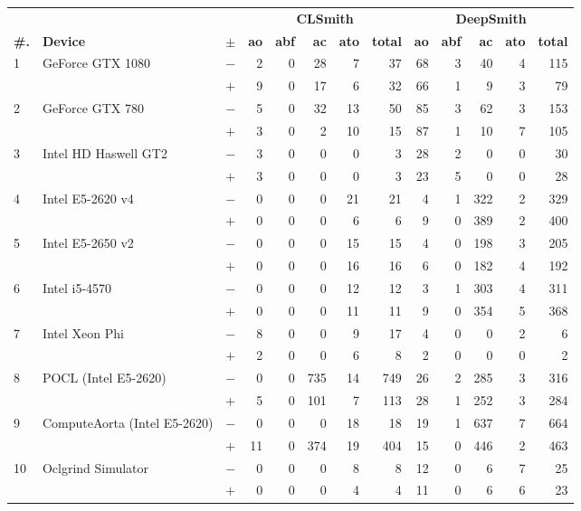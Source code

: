   \begin{tabular}{lll | rrrrr | rrrrr }
  \toprule
  & & & \multicolumn{5}{c|}{\textbf{CLSmith}} & \multicolumn{5}{c}{\textbf{DeepSmith}} \\
  \textbf{\#.} & \textbf{Device} & $\pm$ &
  \textbf{ao} & \textbf{abf} & \textbf{ac} & \textbf{ato} & \textbf{total} &
  \textbf{ao} & \textbf{abf} & \textbf{ac} & \textbf{ato} & \textbf{total} \\
  \midrule
  \multirow{ 2}{*}{1} & \multirow{ 2}{*}{GeForce GTX 1080} & $-$ & 2 & 0 & 28 & 7 & 37       & 68 & 3 & 40 & 4 & 115 \\& & $+$ & 9 & 0 & 17 & 6 & 32 & 66 & 1 & 9 & 3 & 79 \\
\hline
\multirow{ 2}{*}{2} & \multirow{ 2}{*}{GeForce GTX 780} & $-$ & 5 & 0 & 32 & 13 & 50       & 85 & 3 & 62 & 3 & 153 \\& & $+$ & 3 & 0 & 2 & 10 & 15 & 87 & 1 & 10 & 7 & 105 \\
\hline
\multirow{ 2}{*}{3} & \multirow{ 2}{*}{Intel HD Haswell GT2} & $-$ & 3 & 0 & 0 & 0 & 3       & 28 & 2 & 0 & 0 & 30 \\& & $+$ & 3 & 0 & 0 & 0 & 3 & 23 & 5 & 0 & 0 & 28 \\
\hline
\multirow{ 2}{*}{4} & \multirow{ 2}{*}{Intel E5-2620 v4} & $-$ & 0 & 0 & 0 & 21 & 21       & 4 & 1 & 322 & 2 & 329 \\& & $+$ & 0 & 0 & 0 & 6 & 6 & 9 & 0 & 389 & 2 & 400 \\
\hline
\multirow{ 2}{*}{5} & \multirow{ 2}{*}{Intel E5-2650 v2} & $-$ & 0 & 0 & 0 & 15 & 15       & 4 & 0 & 198 & 3 & 205 \\& & $+$ & 0 & 0 & 0 & 16 & 16 & 6 & 0 & 182 & 4 & 192 \\
\hline
\multirow{ 2}{*}{6} & \multirow{ 2}{*}{Intel i5-4570} & $-$ & 0 & 0 & 0 & 12 & 12       & 3 & 1 & 303 & 4 & 311 \\& & $+$ & 0 & 0 & 0 & 11 & 11 & 9 & 0 & 354 & 5 & 368 \\
\hline
\multirow{ 2}{*}{7} & \multirow{ 2}{*}{Intel Xeon Phi} & $-$ & 8 & 0 & 0 & 9 & 17       & 4 & 0 & 0 & 2 & 6 \\& & $+$ & 2 & 0 & 0 & 6 & 8 & 2 & 0 & 0 & 0 & 2 \\
\hline
\multirow{ 2}{*}{8} & \multirow{ 2}{*}{POCL (Intel E5-2620)} & $-$ & 0 & 0 & 735 & 14 & 749       & 26 & 2 & 285 & 3 & 316 \\& & $+$ & 5 & 0 & 101 & 7 & 113 & 28 & 1 & 252 & 3 & 284 \\
\hline
\multirow{ 2}{*}{9} & \multirow{ 2}{*}{ComputeAorta (Intel E5-2620)} & $-$ & 0 & 0 & 0 & 18 & 18       & 19 & 1 & 637 & 7 & 664 \\& & $+$ & 11 & 0 & 374 & 19 & 404 & 15 & 0 & 446 & 2 & 463 \\
\hline
\multirow{ 2}{*}{10} & \multirow{ 2}{*}{Oclgrind Simulator} & $-$ & 0 & 0 & 0 & 8 & 8       & 12 & 0 & 6 & 7 & 25 \\& & $+$ & 0 & 0 & 0 & 4 & 4 & 11 & 0 & 6 & 6 & 23 \\
  \bottomrule
\end{tabular}

